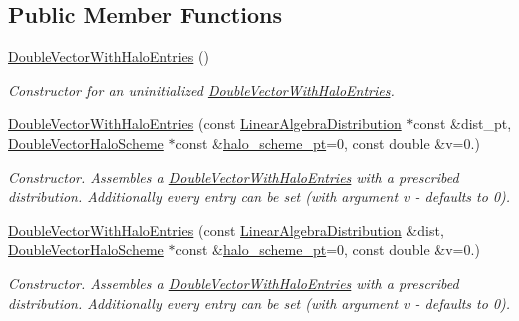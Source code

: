 \subsection*{Public Member Functions}
\begin{DoxyCompactItemize}
\item 
\hyperlink{classoomph_1_1DoubleVectorWithHaloEntries_a023d72d2bd81de0e62c5c860edbca5d5}{Double\+Vector\+With\+Halo\+Entries} ()
\begin{DoxyCompactList}\small\item\em Constructor for an uninitialized \hyperlink{classoomph_1_1DoubleVectorWithHaloEntries}{Double\+Vector\+With\+Halo\+Entries}. \end{DoxyCompactList}\item 
\hyperlink{classoomph_1_1DoubleVectorWithHaloEntries_a11d1cd58eeb7f5d125f76537f49a1c42}{Double\+Vector\+With\+Halo\+Entries} (const \hyperlink{classoomph_1_1LinearAlgebraDistribution}{Linear\+Algebra\+Distribution} $\ast$const \&dist\+\_\+pt, \hyperlink{classoomph_1_1DoubleVectorHaloScheme}{Double\+Vector\+Halo\+Scheme} $\ast$const \&\hyperlink{classoomph_1_1DoubleVectorWithHaloEntries_a233cb55111ceb501a7a76c434801be4c}{halo\+\_\+scheme\+\_\+pt}=0, const double \&v=0.)
\begin{DoxyCompactList}\small\item\em Constructor. Assembles a \hyperlink{classoomph_1_1DoubleVectorWithHaloEntries}{Double\+Vector\+With\+Halo\+Entries} with a prescribed distribution. Additionally every entry can be set (with argument v -\/ defaults to 0). \end{DoxyCompactList}\item 
\hyperlink{classoomph_1_1DoubleVectorWithHaloEntries_a28df73429d7ab3f349849c33a610df8c}{Double\+Vector\+With\+Halo\+Entries} (const \hyperlink{classoomph_1_1LinearAlgebraDistribution}{Linear\+Algebra\+Distribution} \&dist, \hyperlink{classoomph_1_1DoubleVectorHaloScheme}{Double\+Vector\+Halo\+Scheme} $\ast$const \&\hyperlink{classoomph_1_1DoubleVectorWithHaloEntries_a233cb55111ceb501a7a76c434801be4c}{halo\+\_\+scheme\+\_\+pt}=0, const double \&v=0.)
\begin{DoxyCompactList}\small\item\em Constructor. Assembles a \hyperlink{classoomph_1_1DoubleVectorWithHaloEntries}{Double\+Vector\+With\+Halo\+Entries} with a prescribed distribution. Additionally every entry can be set (with argument v -\/ defaults to 0). \end{DoxyCompactList}\item 

\end{DoxyCompactItemize}
